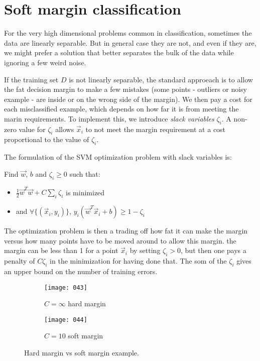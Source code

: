 \section{Soft margin classification}
For the very high dimensional problems common in classification, sometimes the data are linearly separable. But in general case they are not, and even if they are, we might prefer a solution that better separates the bulk of the data while ignoring a few weird noise. 

If the training set \(D\) is not linearly separable, the standard approeach is to allow the fat decision margin to make a few mistakes (some points - outliers or noisy example - are inside or on the wrong side of the margin). We then pay a cost for each misclassified example, which depends on how far it is from meeting the marin requirements. To implement this, we introduce \emph{slack variables} \(\zeta_i\). A non-zero value for \(\zeta_i\) allows \(\vec{x}_i\) to not meet the margin requirement at a cost proportional to the value of \(\zeta_i\).

The formulation of the SVM optimization problem with slack variables is:

Find \(\vec{w}\), \(b\) and \(\zeta_i \geq 0\) such that:
\begin{itemize}
    \item
    \(\frac 1 2 \vec{w}^T \vec{w} + C \sum_i \zeta_i\) is minimized
    \item
    and \(\forall \{(\vec{x}_i, y_i)\}\), \(y_i(\vec{w}^T \vec{x}_i + b) \geq 1 - \zeta_i\)
\end{itemize}

The optimization problem is then a trading off how fat it can make the margin versus how many points have to be moved around to allow this margin. the margin can be less than 1 for a point \(\vec{x}_i\) by setting \(\zeta_i > 0\), but then one pays a penalty of \(C\zeta_i\) in the minimization for having done that. The som of the \(\zeta_i\) gives an upper bound on the number of training errors.

\begin{figure}[h!]
    \centering
    \begin{subfigure}{.4\textwidth}
        \centering
        \texttt{[image: 043]}
        \caption{\(C = \infty\) hard margin}
    \end{subfigure}
    \begin{subfigure}{.4\textwidth}
        \centering
        \texttt{[image: 044]}
        \caption{\(C=10\) soft margin}
    \end{subfigure}
    \caption{Hard margin vs soft margin example.}
\end{figure}

